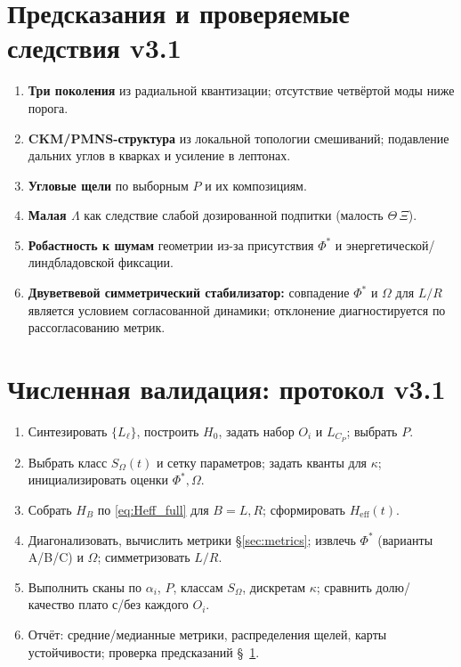 \documentclass[a4paper,12pt]{article}
\def\Omega{Ω}%
\def\Xi{Ξ}%
\def\Theta{Θ}%
\def\Phi{Φ}%
\def\Lambda{Λ}%
\begin{document}
\section{Предсказания и проверяемые следствия v3.1}
\label{sec:predictions}
\begin{enumerate}
\item \textbf{Три поколения} из радиальной квантизации; отсутствие четвёртой моды ниже порога.
\item \textbf{CKM/PMNS-структура} из локальной топологии смешиваний; подавление дальних углов в кварках и усиление в лептонах.
\item \textbf{Угловые щели} по выборным $P$ и их композициям.
\item \textbf{Малая $\Lambda$} как следствие слабой дозированной подпитки (малость $\Theta\,\Xi$).
\item \textbf{Робастность к шумам} геометрии из-за присутствия $\Phi^*$ и энергетической/линдбладовской фиксации.
\item \textbf{Двуветвевой симметрический стабилизатор:} совпадение $\Phi^*$ и $\Omega$ для $L/R$ является условием согласованной динамики; отклонение диагностируется по рассогласованию метрик.
\end{enumerate}

\section{Численная валидация: протокол v3.1}
\begin{enumerate}
\item Синтезировать $\{L_\ell\}$, построить $H_0$, задать набор $O_i$ и $L_{C_P}$; выбрать $P$.
\item Выбрать класс $S_{\Omega}(t)$ и сетку параметров; задать кванты для $\kappa$; инициализировать оценки $\Phi^*,\Omega$.
\item Собрать $H_B$ по \eqref{eq:Heff_full} для $B=L,R$; сформировать $H_{\mathrm{eff}}(t)$.
\item Диагонализовать, вычислить метрики \S\ref{sec:metrics}; извлечь $\Phi^*$ (варианты A/B/C) и $\Omega$; симметризовать $L/R$.
\item Выполнить сканы по $\alpha_i$, $P$, классам $S_{\Omega}$, дискретам $\kappa$; сравнить долю/качество плато с/без каждого $O_i$.
\item Отчёт: средние/медианные метрики, распределения щелей, карты устойчивости; проверка предсказаний \S~\ref{sec:predictions}.
\end{enumerate}
\end{document}
